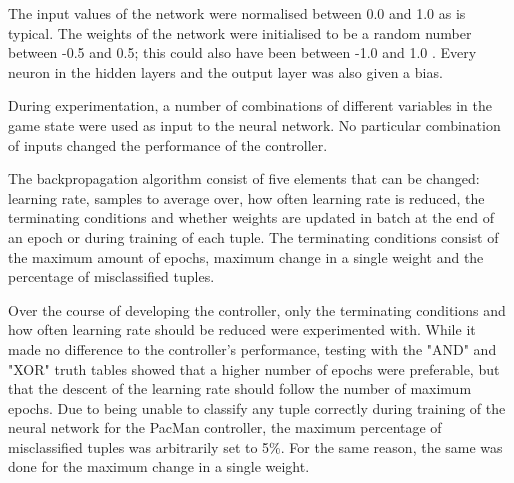 The input values of the network were normalised between 0.0 and 1.0 as is typical\cite[p.400]{Han:2011:DMC:1972541}. The weights of the network were initialised to be a random number between -0.5 and 0.5; this could also have been between -1.0 and 1.0 \cite[p.400]{Han:2011:DMC:1972541}. Every neuron in the hidden layers and the output layer was also given a bias.

During experimentation, a number of combinations of different variables in the game state were used as input to the neural network. No particular combination of inputs changed the performance of the controller.

The backpropagation algorithm consist of five elements that can be changed: learning rate, samples to average over, how often learning rate is reduced, the terminating conditions and whether weights are updated in batch at the end of an epoch or during training of each tuple. The terminating conditions consist of the maximum amount of epochs, maximum change in a single weight and the percentage of misclassified tuples\cite{Han:2011:DMC:1972541}.

Over the course of developing the controller, only the terminating conditions and how often learning rate should be reduced were experimented with. While it made no difference to the controller's performance, testing with the "AND" and "XOR" truth tables showed that a higher number of epochs were preferable, but that the descent of the learning rate should follow the number of maximum epochs. Due to being unable to classify any tuple correctly during training of the neural network for the PacMan controller, the maximum percentage of misclassified tuples was arbitrarily set to 5\%. For the same reason, the same was done for the maximum change in a single weight.